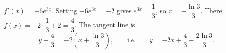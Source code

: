 $f'(x)=-6e^{3x}$. Setting $-6e^{3x}=-2$ gives $e^{3x}=\dfrac13$, so $x=-\dfrac{\ln3}{3}$. There $f(x)=-2\cdot\dfrac13+2=\dfrac43$. The tangent line is
\[y-\dfrac43=-2\left(x+\dfrac{\ln3}{3}\right),\qquad\text{i.e.}\qquad\boxed{y=-2x+\dfrac43-\dfrac{2\ln3}{3}}.\]
